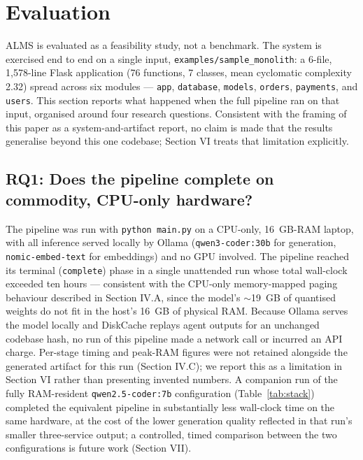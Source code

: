 \documentclass[conference]{IEEEtran}
\begin{document}
\section{Evaluation}

ALMS is evaluated as a feasibility study, not a benchmark. The system is exercised end to end on a single input, \texttt{examples/sample\_monolith}: a 6-file, 1,578-line Flask application (76 functions, 7 classes, mean cyclomatic complexity 2.32) spread across six modules --- \texttt{app}, \texttt{database}, \texttt{models}, \texttt{orders}, \texttt{payments}, and \texttt{users}. This section reports what happened when the full pipeline ran on that input, organised around four research questions. Consistent with the framing of this paper as a system-and-artifact report, no claim is made that the results generalise beyond this one codebase; Section VI treats that limitation explicitly.

\subsection{RQ1: Does the pipeline complete on commodity, CPU-only hardware?}

The pipeline was run with \texttt{python main.py} on a CPU-only, 16~GB-RAM laptop, with all inference served locally by Ollama (\texttt{qwen3-coder:30b} for generation, \texttt{nomic-embed-text} for embeddings) and no GPU involved. The pipeline reached its terminal (\texttt{complete}) phase in a single unattended run whose total wall-clock exceeded ten hours --- consistent with the CPU-only memory-mapped paging behaviour described in Section IV.A, since the model's $\sim$19~GB of quantised weights do not fit in the host's 16~GB of physical RAM. Because Ollama serves the model locally and DiskCache replays agent outputs for an unchanged codebase hash, no run of this pipeline made a network call or incurred an API charge. Per-stage timing and peak-RAM figures were not retained alongside the generated artifact for this run (Section IV.C); we report this as a limitation in Section VI rather than presenting invented numbers. A companion run of the fully RAM-resident \texttt{qwen2.5-coder:7b} configuration (Table~\ref{tab:stack}) completed the equivalent pipeline in substantially less wall-clock time on the same hardware, at the cost of the lower generation quality reflected in that run's smaller three-service output; a controlled, timed comparison between the two configurations is future work (Section VII).
\end{document}
